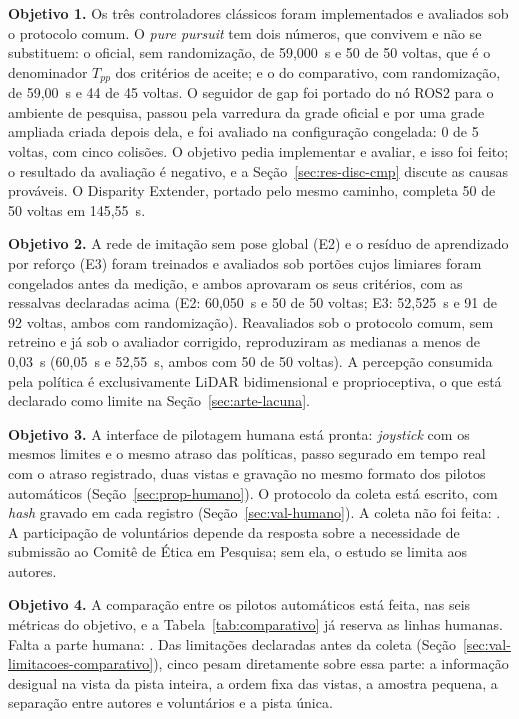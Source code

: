 \textbf{Objetivo 1.} Os três controladores clássicos foram implementados e
avaliados sob o protocolo comum. O \textit{pure pursuit} tem dois números, que
convivem e não se substituem: o oficial, sem randomização, de 59,000~s e 50 de
50 voltas, que é o denominador $T_{pp}$ dos critérios de aceite; e o do
comparativo, com randomização, de 59,00~s e 44 de 45 voltas. O seguidor de gap foi
portado do nó ROS2 para o ambiente de pesquisa, passou pela varredura da grade
oficial e por uma grade ampliada criada depois dela, e foi avaliado na
configuração congelada: 0 de 5 voltas, com cinco colisões. O objetivo pedia
implementar e avaliar, e isso foi feito; o resultado da avaliação é negativo, e a
Seção~\ref{sec:res-disc-cmp} discute as causas prováveis. O Disparity Extender,
portado pelo mesmo caminho, completa 50 de 50 voltas em 145,55~s.

\textbf{Objetivo 2.} A rede de imitação sem pose global (E2) e o resíduo de
aprendizado por reforço (E3) foram treinados e avaliados sob portões cujos
limiares foram congelados antes da medição, e ambos aprovaram os seus critérios,
com as ressalvas declaradas acima (E2: 60,050~s e 50 de 50 voltas; E3: 52,525~s e
91 de 92 voltas, ambos com randomização). Reavaliados sob o protocolo comum, sem
retreino e já sob o avaliador corrigido, reproduziram as medianas a menos de
0,03~s (60,05~s e 52,55~s, ambos com 50 de 50 voltas).
A percepção consumida pela política é exclusivamente LiDAR bidimensional e
proprioceptiva, o que está declarado como limite na Seção~\ref{sec:arte-lacuna}.

\textbf{Objetivo 3.} A interface de pilotagem humana está pronta: \textit{joystick}
com os mesmos limites e o mesmo atraso das políticas, passo segurado em tempo
real com o atraso registrado, duas vistas e gravação no mesmo formato dos pilotos
automáticos (Seção~\ref{sec:prop-humano}). O protocolo da coleta está escrito,
com \textit{hash} gravado em cada registro (Seção~\ref{sec:val-humano}). A coleta
não foi feita: . A participação de
voluntários depende da resposta sobre a necessidade de submissão ao Comitê de
Ética em Pesquisa; sem ela, o estudo se limita aos autores.

\textbf{Objetivo 4.} A comparação entre os pilotos automáticos está feita, nas
seis métricas do objetivo, e a Tabela~\ref{tab:comparativo} já reserva as linhas
humanas. Falta a parte humana: . Das limitações declaradas antes da
coleta (Seção~\ref{sec:val-limitacoes-comparativo}), cinco pesam diretamente
sobre essa parte: a informação desigual na vista da pista inteira, a ordem fixa
das vistas, a amostra pequena, a separação entre autores e voluntários e a pista
única.

